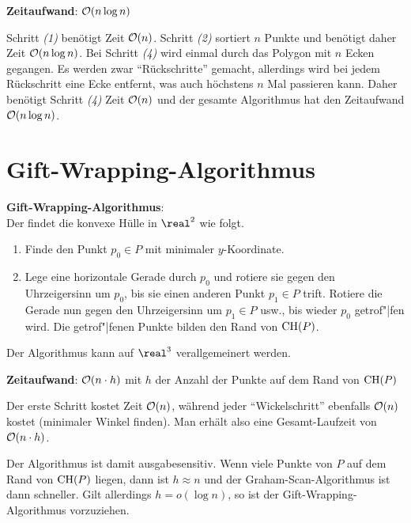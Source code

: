 \linie

\textbf{Zeitaufwand}:
$\mathcal{O}(n \log n)$

\begin{Beweis}
    Schritt \emph{(1)} benötigt Zeit $\mathcal{O}(n)$.
    Schritt \emph{(2)} sortiert $n$ Punkte und benötigt daher Zeit $\mathcal{O}(n \log n)$.
    Bei Schritt \emph{(4)} wird einmal durch das Polygon mit $n$ Ecken gegangen.
    Es werden zwar "`Rückschritte"' gemacht, allerdings wird bei jedem Rückschritt eine Ecke
    entfernt, was auch höchstens $n$ Mal passieren kann.
    Daher benötigt Schritt \emph{(4)} Zeit $\mathcal{O}(n)$ und der gesamte Algorithmus hat den
    Zeitaufwand $\mathcal{O}(n \log n)$.
\end{Beweis}

\pagebreak

\section{%
    Gift-Wrapping-Algorithmus%
}

\textbf{Gift-Wrapping-Algorithmus}:\\
Der  findet die konvexe Hülle in $\real^2$ wie folgt.
\begin{enumerate}
    \item
    Finde den Punkt $p_0 \in P$ mit minimaler $y$-Koordinate.

    \item
    Lege eine horizontale Gerade durch $p_0$ und rotiere sie gegen den Uhrzeigersinn um $p_0$,
    bis sie einen anderen Punkt $p_1 \in P$ trift.
    Rotiere die Gerade nun gegen den Uhrzeigersinn um $p_1 \in P$ usw.,
    bis wieder $p_0$ getrof"|fen wird.
    Die getrof"|fenen Punkte bilden den Rand von $\operatorname{CH}(P)$.
\end{enumerate}
Der Algorithmus kann auf $\real^3$ verallgemeinert werden.

\linie

\textbf{Zeitaufwand}:
$\mathcal{O}(n \cdot h)$ mit $h$ der Anzahl der Punkte auf dem Rand von $\operatorname{CH}(P)$

\begin{Beweis}
    Der erste Schritt kostet Zeit $\mathcal{O}(n)$,
    während jeder "`Wickelschritt"' ebenfalls $\mathcal{O}(n)$ kostet (minimaler Winkel finden).
    Man erhält also eine Gesamt-Laufzeit von $\mathcal{O}(n \cdot h)$.
\end{Beweis}

Der Algorithmus ist damit ausgabesensitiv.
Wenn viele Punkte von $P$ auf dem Rand von $\operatorname{CH}(P)$ liegen, dann ist $h \approx n$ und
der Graham-Scan-Algorithmus ist dann schneller.
Gilt allerdings $h = o(\log n)$, so ist der Gift-Wrapping-Algorithmus vorzuziehen.

